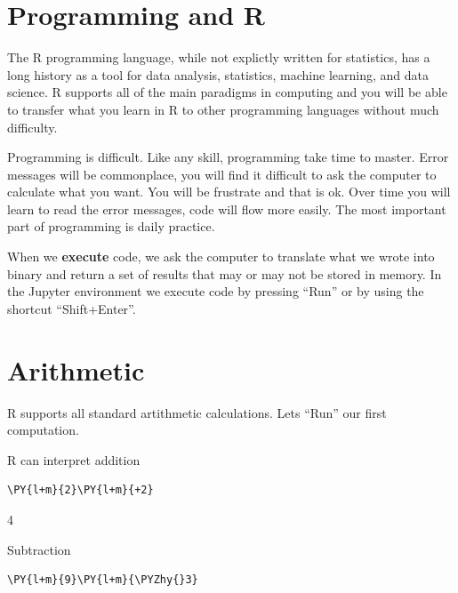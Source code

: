     \hypertarget{programming-and-r}{%
\section{Programming and R}\label{programming-and-r}}

The R programming language, while not explictly written for statistics,
has a long history as a tool for data analysis, statistics, machine
learning, and data science. R supports all of the main paradigms in
computing and you will be able to transfer what you learn in R to other
programming languages without much difficulty.

Programming is difficult. Like any skill, programming take time to
master. Error messages will be commonplace, you will find it difficult
to ask the computer to calculate what you want. You will be frustrate
and that is ok. Over time you will learn to read the error messages,
code will flow more easily. The most important part of programming is
daily practice.

When we \textbf{execute} code, we ask the computer to translate what we
wrote into binary and return a set of results that may or may not be
stored in memory. In the Jupyter environment we execute code by pressing
``Run'' or by using the shortcut ``Shift+Enter''.

    \hypertarget{arithmetic}{%
\section{Arithmetic}\label{arithmetic}}

R supports all standard artithmetic calculations. Lets ``Run'' our first
computation.

R can interpret addition

    \begin{tcolorbox}[breakable, size=fbox, boxrule=1pt, pad at break*=1mm,colback=cellbackground, colframe=cellborder]
\begin{Verbatim}[commandchars=\\\{\}]
\PY{l+m}{2}\PY{l+m}{+2}
\end{Verbatim}
\end{tcolorbox}

    4

    
    Subtraction

    \begin{tcolorbox}[breakable, size=fbox, boxrule=1pt, pad at break*=1mm,colback=cellbackground, colframe=cellborder]
\begin{Verbatim}[commandchars=\\\{\}]
\PY{l+m}{9}\PY{l+m}{\PYZhy{}3}
\end{Verbatim}
\end{tcolorbox}


